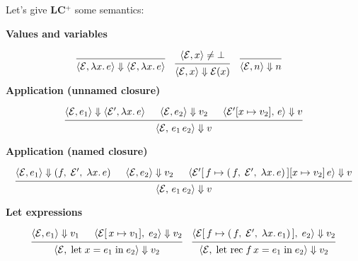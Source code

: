 \newpage 

\noindent
Let's give \textbf{LC$^+$} some semantics:
\begin{Def}[LC$^+$ Semantics]

    \textbf{Values and variables}

\[
\begin{matrix}
\begin{prooftree}
  \infer0{
    \langle\mathcal{E}, \lambda x.\,e\rangle \Downarrow \langle\mathcal{E}, \lambda x.\,e\rangle
  }
\end{prooftree}
&
\begin{prooftree}
    \hypo{\langle\mathcal{E}, x\rangle \neq \bot}
  \infer1{
    \langle\mathcal{E}, x\rangle \Downarrow \mathcal{E}(x)
  }
\end{prooftree}
&
\begin{prooftree}
  \infer0{
    \langle\mathcal{E}, n\rangle \Downarrow n
  }
\end{prooftree}
&
\end{matrix}
\]
\noindent
\textbf{Application (unnamed closure)}

\[
\begin{prooftree}
  \hypo{\langle\mathcal{E}, e_{1}\rangle \Downarrow \langle\mathcal{E}', \lambda x.\,e\rangle}
  \hypo{\langle\mathcal{E}, e_{2}\rangle \Downarrow v_{2}}
  \hypo{\langle\mathcal{E}'[x \mapsto v_{2}],\, e\rangle \Downarrow v}
  \infer3{
    \langle\mathcal{E},\, e_{1}\,e_{2}\rangle \Downarrow v
  }
\end{prooftree}
\]

\noindent
\textbf{Application (named closure)}

\[
\begin{prooftree}
  \hypo{\langle\mathcal{E}, e_{1}\rangle \Downarrow (f,\;\mathcal{E}',\;\lambda x.\,e)}
  \hypo{\langle\mathcal{E}, e_{2}\rangle \Downarrow v_{2}}
  \hypo{\langle\mathcal{E}'[\,f \mapsto (\,f,\;\mathcal{E}',\;\lambda x.\,e)\,][x \mapsto v_{2}]\,e\rangle \Downarrow v}
  \infer3{
    \langle\mathcal{E},\, e_{1}\,e_{2}\rangle \Downarrow v
  }
\end{prooftree}
\]

\noindent
\textbf{Let expressions}

\[
\begin{matrix}
\begin{prooftree}
  \hypo{\langle\mathcal{E}, e_{1}\rangle \Downarrow v_{1}}
  \hypo{\langle\mathcal{E}[\,x \mapsto v_{1}],\; e_{2}\rangle \Downarrow v_2}
  \infer2{
    \langle\mathcal{E},\; \text{let}\; x = e_{1}\; \text{in}\; e_{2}\rangle \Downarrow v_2
  }
\end{prooftree}
&
\begin{prooftree}
  \hypo{\langle\mathcal{E}[\,f \mapsto (\,f,\;\mathcal{E}',\;\lambda x.\,e_1)\,],\; e_{2}\rangle \Downarrow v_2}
  \infer1{
    \langle\mathcal{E},\; \text{let rec}\; f\,x = e_{1}\; \text{in}\; e_{2}\rangle \Downarrow v_2
  }
\end{prooftree}
\end{matrix}
\]

\end{Def}